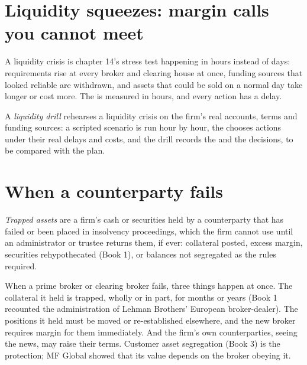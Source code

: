 \section{Liquidity squeezes: margin calls you cannot meet}

A liquidity crisis is chapter 14's stress test happening in hours instead of days: requirements rise at every broker and clearing house at once,
funding sources that looked reliable are withdrawn, and assets that could be sold on a normal day take longer or cost more. The  is
measured in hours, and every action has a delay.

\begin{definition}\label{def:fm:crisis-management:drill}
A \emph{liquidity drill} rehearses a liquidity crisis on the firm's real accounts, terms and funding sources: a scripted
scenario is run hour by hour, the  chooses actions under their real delays and costs, and the drill records the 
and the decisions, to be compared with the plan.
\end{definition}

\section{When a counterparty fails}

\begin{definition}\label{def:fm:crisis-management:trapped}
\emph{Trapped assets} are a firm's cash or securities held by a counterparty that has failed or been placed in insolvency
proceedings, which the firm cannot use until an administrator or trustee returns them, if ever: collateral posted, excess margin, securities
rehypothecated (Book 1), or balances not segregated as the rules required.
\end{definition}

When a prime broker or clearing broker fails, three things happen at once. The collateral it held is trapped, wholly or in part, for months or
years (Book 1 recounted the administration of Lehman Brothers' European broker-dealer). The positions it held must be moved or re-established
elsewhere, and the new broker requires margin for them immediately. And the firm's own counterparties, seeing the news, may raise their terms.
Customer asset segregation (Book 3) is the protection; MF Global showed that its value depends on the broker obeying it.

